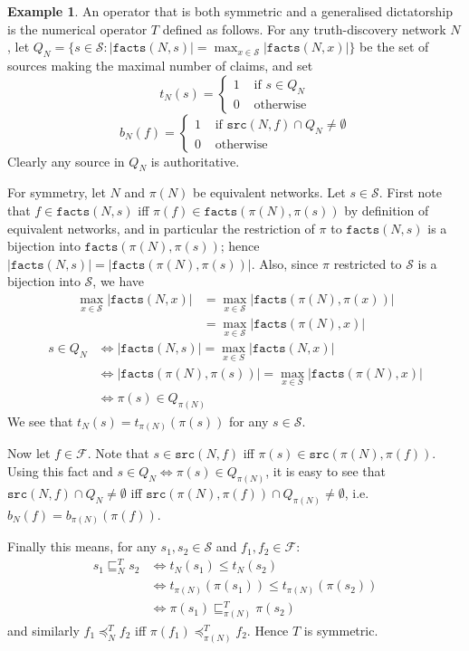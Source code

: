 \documentclass{article}
\theoremstyle{definition} \newtheorem{definition}{Definition}
\theoremstyle{definition} \newtheorem{example}{Example}
\theoremstyle{plain} \newtheorem{axiom}{Axiom}
\theoremstyle{plain} \newtheorem*{remark}{Remark}
\theoremstyle{remark} \newtheorem*{notation}{Notation}
\theoremstyle{plain} \newtheorem{lemma}{Lemma}
\theoremstyle{plain} \newtheorem{theorem}{Theorem}
\theoremstyle{plain} \newtheorem{proposition}{Proposition}
\renewcommand{\S}{\mathcal{S}}  %
\newcommand{\F}{\mathcal{F}}
\newcommand{\sle}{\sqsubseteq}
\newcommand{\fle}{\preceq}
\newcommand{\src}{\texttt{src}}
\newcommand{\fact}{\texttt{facts}}
\begin{document}
\begin{example}
\label{example:symm_and_gen_dict}
An operator that is both symmetric and a generalised dictatorship is the
numerical operator $T$ defined as follows. For any truth-discovery network $N$,
let $Q_N = \{s \in \S \colon |\fact(N, s)| = \max_{x \in \S}{|\fact(N, x)|}\}$
be the set of sources making the maximal number of claims, and set
\[
    t_N(s) = \begin{cases}
        1 & \text{ if } s \in Q_N \\
        0 & \text{ otherwise}
    \end{cases}
\]
\[
    b_N(f) = \begin{cases}
        1 & \text{ if } \src(N, f) \cap Q_N \ne \emptyset \\
        0 & \text{ otherwise}
    \end{cases}
\]
Clearly any source in $Q_N$ is authoritative.

For symmetry, let $N$ and $\pi(N)$ be equivalent networks. Let $s \in \S$.
First note that $f \in \fact(N, s)$ iff $\pi(f) \in \fact(\pi(N), \pi(s))$ by
definition of equivalent networks, and in particular the restriction of $\pi$
to $\fact(N, s)$ is a bijection into $\fact(\pi(N), \pi(s))$; hence $|\fact(N,
s)| = |\fact(\pi(N), \pi(s))|$. Also, since $\pi$ restricted to $\S$ is a
bijection into $\S$, we have
\begin{align*}
    \max_{x \in \S}{|\fact(N, x)|} & = \max_{x \in \S}{|\fact(\pi(N), \pi(x))|} \\
                                   & = \max_{x \in \S}{|\fact(\pi(N), x)|}
\end{align*}
\begin{align*}
    s \in Q_N & \iff |\fact(N, s)| = \max_{x \in S}{|\fact(N, x)|} \\
              & \iff |\fact(\pi(N), \pi(s))| = \max_{x \in S}{|\fact(\pi(N), x)|} \\
              & \iff \pi(s) \in Q_{\pi(N)}
\end{align*}
We see that $t_N(s) = t_{\pi(N)}(\pi(s))$ for any $s \in \S$.

Now let $f \in \F$. Note that $s \in \src(N, f)$ iff $\pi(s) \in \src(\pi(N),
\pi(f))$. Using this fact and $s \in Q_N \iff \pi(s) \in Q_{\pi(N)}$, it is
easy to see that $\src(N, f) \cap Q_N \ne \emptyset$ iff $\src(\pi(N), \pi(f))
\cap Q_{\pi(N)} \ne \emptyset$, i.e. $b_N(f) = b_{\pi(N)}(\pi(f))$.

Finally this means, for any $s_1, s_2 \in \S$ and $f_1, f_2 \in \F$:
\begin{align*}
    s_1 \sle_N^T s_2 & \iff t_N(s_1) \le t_N(s_2) \\
                     & \iff t_{\pi(N)}(\pi(s_1)) \le t_{\pi(N)}(\pi(s_2)) \\
                     & \iff \pi(s_1) \sle_{\pi(N)}^T \pi(s_2)
\end{align*}
and similarly $f_1 \fle_N^T f_2$ iff $\pi(f_1) \fle_{\pi(N)}^T f_2$. Hence $T$
is symmetric.
\end{example}
\end{document}
